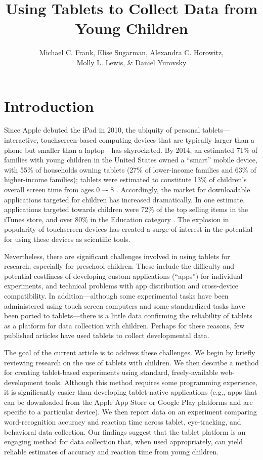\documentclass[man,noapacite]{apa2}
\title{Using Tablets to Collect Data from Young Children}
\author{Michael C. Frank, Elise Sugarman, Alexandra C. Horowitz, \\ Molly L. Lewis, \& Daniel Yurovsky}
\affiliation{Department of Psychology, Stanford University}
\begin{document}
\maketitle


\section{Introduction}

Since Apple debuted the iPad in 2010, the ubiquity of personal tablets---interactive, touchscreen-based computing devices that are typically larger than a phone but smaller than a laptop---has skyrocketed. 
By 2014, an estimated 71\% of families with young children in the United States owned a ``smart'' mobile device, with 55\% of households owning tablets (27\% of lower-income families and 63\% of higher-income families); tablets were estimated to constitute 13\% of children's overall screen time from ages 0 –- 8 \cite{rideout2014}.
Accordingly, the market for downloadable applications targeted for children has increased dramatically. In one estimate, applications targeted towards children were 72\% of the top selling items in the iTunes store, and over 80\% in the Education category \cite{shuler2012}. The explosion in popularity of touchscreen devices has created a surge of interest in the potential for using these devices as scientific tools. 

Nevertheless, there are significant challenges involved in using tablets for research, especially for preschool children. These include the difficulty and potential costliness of developing custom applications (``apps'') for individual experiments, and technical problems with app distribution and cross-device compatibility. In addition---although some experimental tasks have been administered using touch screen computers and some standardized tasks have been ported to tablets---there is a little data confirming the reliability of tablets as a platform for data collection with children. Perhaps for these reasons, few published articles have used tablets to collect developmental data. 

The goal of the current article is to address these challenges. We begin by briefly reviewing research on the use of tablets with children. We then describe a method for creating tablet-based experiments using standard, freely-available web-development tools. Although this method requires some programming experience, it is significantly easier than developing tablet-native applications (e.g., apps that can be downloaded from the Apple App Store or Google Play platforms and are specific to a particular device). We then report data on an experiment comparing word-recognition accuracy and reaction time across tablet, eye-tracking, and behavioral data collection. Our findings suggest that the tablet platform is an engaging method for data collection that, when used appropriately, can yield reliable estimates of accuracy and reaction time from young children. 
\end{document}
